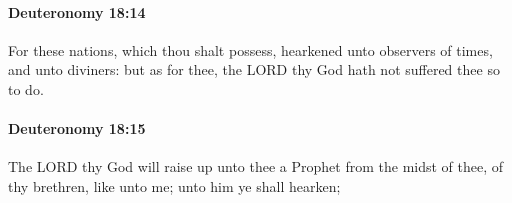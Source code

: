 		\paragraph{Deuteronomy 18:14} %
			\label{DEUTERONOMY-18-14}

			For these nations, which thou shalt possess, hearkened unto observers of times, and unto diviners: but as for thee, the LORD thy God hath not suffered thee so to do.


		\paragraph{Deuteronomy 18:15} %
			\label{DEUTERONOMY-18-15}

			The LORD thy God will raise up unto thee a Prophet from the midst of thee, of thy brethren, like unto me; unto him ye shall hearken;


